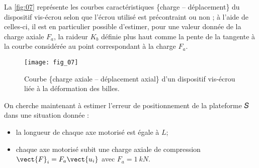 \ifprof
\begin{corrige}
\end{corrige}
\else
\fi

La \autoref{fig:07} représente les courbes caractéristiques \{charge -- déplacement\} du dispositif vis-écrou selon que l’écrou utilisé est précontraint ou non ; à l’aide de celles-ci, il est en particulier possible d’estimer, pour une
valeur donnée de la charge axiale $F_a$, la raideur $K_b$ définie plus haut comme la pente de la tangente à la courbe considérée au point correspondant à la charge $F_a$.


\begin{figure}[H]
\centering
\texttt{[image: fig\_07]}
\caption{\label{fig:07}  Courbe \{charge axiale -- déplacement axial\} d’un dispositif vis-écrou liée à la
déformation des billes.}
\end{figure}


\ifprof
\begin{corrige}
\end{corrige}
\else
\fi


On cherche maintenant à estimer l’erreur de positionnement de la plateforme 𝑆 dans une situation donnée :
\begin{itemize}
\item la longueur de chaque axe motorisé est égale à $L$;
\item chaque axe motorisé subit une charge axiale de compression $\vect{F}_i=F_a \vect{u_i}$ avec $F_a = \SI{1}{kN}$.
\end{itemize}

